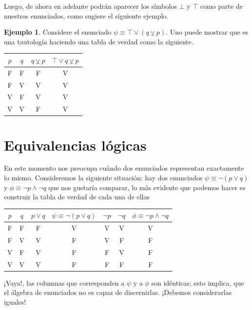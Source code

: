 \documentclass{book}
\theoremstyle{definition}
\newtheorem{ejm}{Ejemplo}[chapter]
\begin{document}
Luego, de ahora en adelante podrán aparecer los símbolos $\bot$ y $\top$ como parte de nuestros enunciados, como sugiere el siguiente ejemplo.

\begin{ejm}
	Considere el enunciado $\psi \equiv \top \vee (q \veebar p)$. Uno puede mostrar que es una tautología haciendo una tabla de verdad como la siguiente.
	\begin{center}\begin{tabular}{|c|c||c|c|}
		\hline
		$p$ & $q$ & $q\veebar p$ & $\top \vee q\veebar p$ \\
		\hline\hline
		F & F & F & V \\ \hline
		F & V & V & V \\ \hline
		V & F & V & V \\ \hline
		V & V & F & V \\ \hline
	\end{tabular}\end{center}
\end{ejm}

\section{Equivalencias lógicas}
En este momento nos preocupa cuándo dos enunciados representan exactamente lo mismo.
Consideremos la siguiente situación: hay dos enunciados $\psi \equiv \neg (p \vee q)$ y $\phi \equiv \neg p \wedge \neg q$ que nos gustaría comparar, lo más evidente que podemos hacer es construir la tabla de verdad de cada una de ellas
\begin{center}\begin{tabular}{|c|c||c|c|c|c|c|}
	\hline
	$p$ & $q$ & $p\vee q$ & $\psi \equiv \neg (p \vee q)$ & $\neg p$ & $\neg q$ & $\phi \equiv \neg p \wedge \neg q$ \\
	\hline\hline
	F & F & F & V & V & V & V \\ \hline
	F & V & V & F & V & F & F \\ \hline
	V & F & V & F & F & V & F \\ \hline
	V & V & V & F & F & F & F \\ \hline
\end{tabular}\end{center}
¡Vaya!, las columnas que corresponden a $\psi$ y a $\phi$ son idénticas; esto implica, que el álgebra de enunciados no es capaz de discernirlas. ¡Debemos considerarlas iguales!
\end{document}
